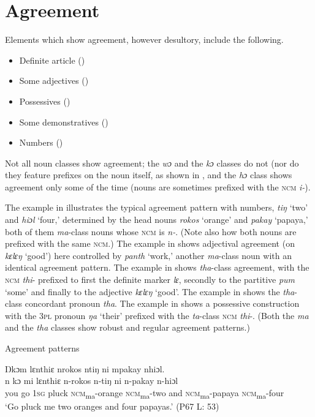 \section{Agreement}
\hypertarget{Toc115517788}{}\label{sec:5.1}
Elements which show agreement, however desultory, include the following.

\begin{itemize}
\item Definite article ()
\item Some adjectives ()
\item Possessives ()
\item Some demonstratives ()
\item Numbers ()
\end{itemize}

Not all noun classes show agreement; the \textit{wɔ} and the \textit{kɔ} classes do not (nor do they feature prefixes on the noun itself, as shown in , and the \textit{hɔ} class shows agreement only some of the time (nouns are sometimes prefixed with the \textsc{ncm} \textit{i-}).

The example in  illustrates the typical agreement pattern with numbers, \textit{tiŋ} ‘two' and \textit{hiɔl} ‘four,' determined by the head nouns \textit{rokos} ‘orange' and \textit{pakay} ‘papaya,' both of them \textit{ma}{}-class nouns whose \textsc{ncm} is \textit{n-}. (Note also how both nouns are prefixed with the same \textsc{ncm}.) The example in  shows adjectival agreement (on \textit{kɛlɛŋ} ‘good') here controlled by \textit{panth} ‘work,' another \textit{ma}{}-class noun with an identical agreement pattern. The example in  shows \textit{tha}{}-class agreement, with the \textsc{ncm} \textit{thi}{}- prefixed to first the definite marker \textit{lɛ}, secondly to the partitive \textit{pum} ‘some' and finally to the adjective \textit{kɛlɛŋ} ‘good'. The example in  shows the \textit{tha}{}-class concordant pronoun \textit{tha}. The example in  shows a possessive construction with the \textsc{3pl} pronoun \textit{ŋa} ‘their' prefixed with the \textit{ta}{}-class \textsc{ncm} \textit{thi}{}-. (Both the \textit{ma} and the \textit{tha} classes show robust and regular agreement patterns.)

\largerpage
\ea%
    \label{ex:136}
    Agreement patterns

\ea \label{ex:136a} Ŋkɔm lɛnthiɛ nrokos ntiŋ ni mpakay nhiɔl.\\
\gll n    kɔ    mi    lɛnthiɛ  n-rokos        n-tiŋ      ni    n-pakay        n-hiɔl\\
you  go    1\textsc{sg}  pluck    \textsc{ncm}\textsubscript{ma}\textsc{{}-}orange    \textsc{ncm}\textsubscript{ma}\textsc{{}-}two  and  \textsc{ncm}\textsubscript{ma}\textsc{{}-}papaya    \textsc{ncm}\textsubscript{ma}\textsc{{}-}four\\
\glt ‘Go pluck me two oranges and four papayas.' (P67 L: 53)

